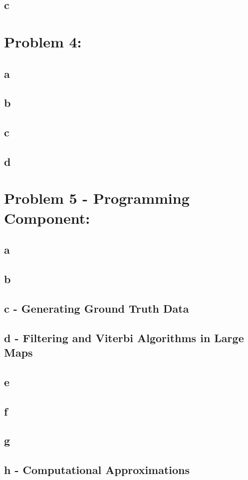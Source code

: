 \documentclass[11pt, oneside]{article}   	%
\begin{document}
\begin{flushleft}
\subsection*{c}
\section*{Problem 4:}
\subsection*{a}

\subsection*{b}
\subsection*{c}
\subsection*{d}
\section*{Problem 5 - Programming Component:}
\subsection*{a}
\subsection*{b}
\subsection*{c - Generating Ground Truth Data}
\subsection*{d - Filtering and Viterbi Algorithms in Large Maps}
\subsection*{e}
\subsection*{f}
\subsection*{g}
\subsection*{h - Computational Approximations}
\end{flushleft}
\end{document}
